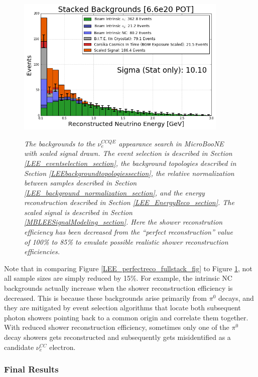 \begin{figure}[ht!]
\centering
\includegraphics[width=0.9\textwidth]{Figures/LEE_recoemu_fullstack_WithAnalysisCuts.png}\\
\caption{\textit{The backgrounds to the $\nu_e^{CCQE}$ appearance search in MicroBooNE with scaled signal drawn. The event selection is described in Section \ref{LEE_eventselection_section}, the background topologies described in Section \ref{LEEbackgroundtopologiessection}, the relative normalization between samples described in Section \ref{LEE_background_normalization_section}, and the energy reconstruction described in Section \ref{LEE_EnergyReco_section}. The scaled signal is described in Section \ref{MBLEESignalModeling_section}. Here the shower reconstrution efficiency has been decreased from the ``perfect reconstruction'' value of 100\% to 85\% to emulate possible realistic shower reconstruction efficiencies.}}
\label{LEE_recoemu_fullstack_fig}
\end{figure}

Note that in comparing Figure \ref{LEE_perfectreco_fullstack_fig} to Figure \ref{LEE_recoemu_fullstack_fig}, not all sample sizes are simply reduced by 15\%. For example, the intrinsic NC backgrounds actually increase when the shower reconstruction efficiency is decreased. This is because these backgrounds arise primarily from $\pi^0$ decays, and they are mitigated by event selection algorithms that locate both subsequent photon showers pointing back to a common origin and correlate them together. With reduced shower reconstruction efficiency, sometimes only one of the $\pi^0$ decay showers gets reconstructed and subsequently gets misidentified as a candidate $\nu_e^{CC}$ electron.


\subsubsection{Final Results}

